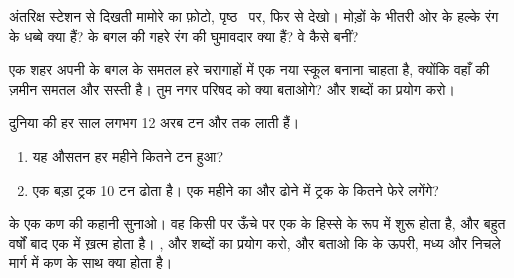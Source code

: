 \begin{exercise}[$\star\star$]\label{exo:g5:water-shapes-the-land:8}
अंतरिक्ष स्टेशन से दिखती मामोरे  का फ़ोटो, पृष्ठ~\pageref{fig:g5:water-shapes-the-land:mamore} पर, फिर से देखो। मोड़ों के भीतरी ओर
के हल्के रंग के धब्बे क्या हैं?  के बगल की गहरे रंग की घुमावदार  क्या हैं? वे
कैसे बनीं?
\end{exercise}

\begin{exercise}[$\star\star$]\label{exo:g5:water-shapes-the-land:9}
एक शहर अपनी  के बगल के समतल हरे चरागाहों में एक नया स्कूल बनाना चाहता है,
क्योंकि वहाँ की ज़मीन समतल और सस्ती है। तुम नगर परिषद को क्या बताओगे?
\emph{} और \emph{} शब्दों का प्रयोग करो।
\end{exercise}

\begin{exercise}[$\star\star$]\label{exo:g5:water-shapes-the-land:10}
दुनिया की  हर साल लगभग 12 अरब टन  और   तक लाती
हैं।
\begin{enumerate}
  \item[(क)] यह औसतन हर महीने कितने टन हुआ?
  \item[(ख)] एक बड़ा ट्रक 10 टन ढोता है। एक महीने का  और  ढोने में ट्रक
        के कितने फेरे लगेंगे?
\end{enumerate}
\end{exercise}

\begin{exercise}[$\star\star\star$]\label{exo:g5:water-shapes-the-land:11}
 के एक कण की कहानी सुनाओ। वह किसी  पर ऊँचे पर एक  के हिस्से के रूप में
शुरू होता है, और बहुत वर्षों बाद एक  में ख़त्म होता है। \emph{},
\emph{} और \emph{} शब्दों का प्रयोग करो, और बताओ कि  के ऊपरी, मध्य
और निचले मार्ग में कण के साथ क्या होता है।
\end{exercise}
